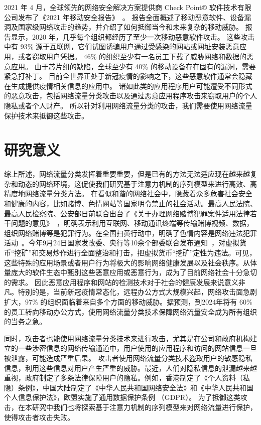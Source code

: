 \documentclass[degree=master,cjk-font=noto]{thuthesis}
\begin{document}
2021 年 4 月，全球领先的网络安全解决方案提供商 Check Point® 软件技术有限公司发布了《2021 年移动安全报告》~\cite{Attack2-report}。
报告全面概述了移动恶意软件、设备漏洞及国家级网络攻击的趋势，并介绍了如何抵御当今和未来复杂的移动威胁。
报告显示，2020 年，几乎每个组织都经历了至少一次移动恶意软件攻击。
这些攻击中有 93\% 源于互联网，它们试图诱骗用户通过受感染的网站或网址安装恶意应用，或者窃取用户凭据。
46\% 的组织至少有一名员工下载了威胁网络和数据的恶意应用。
由于芯片组的缺陷，全球至少有 40\% 的移动设备存在固有的漏洞，需要紧急打补丁。
目前全世界正处于新冠疫情的影响之下，这些恶意软件通常会隐藏在生成提供疫情相关信息的应用中。
诸如此类的应用程序用户可能遭受不同形式的恶意攻击，包括网络流量分类攻击以及通过恶意应用程序攻击来窃取用户的个人隐私或者个人财产。
所以针对利用网络流量分类的攻击，我们需要使用网络流量保护技术来抵御这些攻击。

\section{研究意义}

综上所述，网络流量分类发挥着重要重要，但是已有的方法无法适应现在越来越复杂和动态的网络环境，这促使我们研究基于注意力机制的序列模型来进行高效、高精度地网络流量分类方法。
在看似和谐的网络社会中，隐藏着众多危害社会安全和健康的内容，比如赌博、色情网站等国家明令禁止的社会活动。最高人民法院、最高人民检察院、公安部日前联合出台了《关于办理网络赌博犯罪案件适用法律若干问题的意见》~\cite{intro-9}，明确表示利用互联网、移动通讯终端等传输赌博视频、数据，组织网络赌博等是犯罪行为。在全国扫黄行动中，明确了色情内容是网络违法犯罪活动~\cite{intro-10}。今年9月24日国家发改委、央行等10余个部委联合发布通知~\cite{intro-11}，对虚拟货币“挖矿”和交易炒作进行全面整治和打击，把虚拟货币“挖矿”定性为违法。可见，这些特殊的应用场景或者用户行为将极大的影响网络健康发展以及社会秩序。从体量庞大的软件生态中甄别这些恶意应用或恶意行为，成为了目前网络社会十分急切的需求。
因此恶意应用程序和网站的检测技术对于社会的健康发展来说意义非凡。特别的是，当前新冠疫情常态化，远程办公方式大规模兴起，网络攻击面急剧扩大，97\% 的组织面临着来自多个方面的移动威胁。据预测，到2024年将有 60\% 的员工转向移动办公方式，使用网络流量分类技术保障网络流量安全成为所有组织的当务之急。


同时，攻击者也能使用网络流量分类技术来进行攻击，尤其是在公司和政府机构建立的一些涉密信息的网络传输通道中，用户使用的应用程序和访问的网站信息一旦被泄露，可能造成严重后果。
攻击者使用网络流量分类技术盗取用户的敏感隐私信息，利用这些信息对用户产生严重的威胁。最近，人们对隐私信息的泄漏越来越重视，政府制定了多条法律保障用户的隐私。例如，香港制定了《个人资料（私隐）条例》，中国大陆制定了《中华人民共和国网络安全法》和《中华人民共和国个人信息保护法》，欧盟实施了通用数据保护条例 （GDPR）。
为了抵御这类攻击，在本研究中我们也将探索基于注意力机制的序列模型来对网络流量进行保护，使得攻击者攻击失败。
\end{document}
